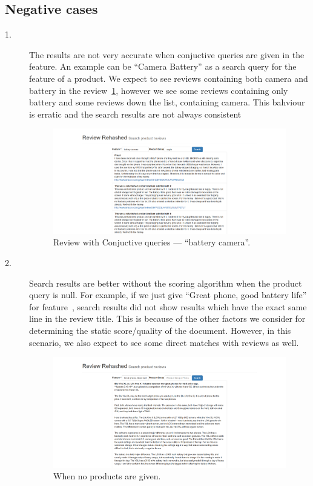 \documentclass{article}
\begin{document}
\subsection{Negative cases}
			\begin{description}
        \item[1.] The results are not very accurate when conjuctive queries are given in the feature. An example can be ``Camera Battery'' as a search query for the feature of a product. We expect to see reviews containing both camera and battery in the review~\ref{fig:battery_camera}, however we see some reviews containing only battery and some reviews down the list, containing camera. This bahviour is erratic and the search results are not always consistent
					\begin{figure}[ht!]
					  \centering
					  \includegraphics[width=1\textwidth]{battery_camera}
					  \caption{Review with Conjuctive queries --- ``battery camera''.~\label{fig:battery_camera}}
					\end{figure}
        \item[2.] Search results are better without the scoring algorithm when the product query is null. For example, if we just give ``Great phone, good battery life'' for feature~\cite{fig:no_product}, search results did not show results which have the exact same line in the review title. This is because of the other factors we consider for determining the static score/quality of the document. However, in this scenario, we also expect to see some direct matches with reviews as well. 
					\begin{figure}[ht!]
					  \centering
					  \includegraphics[width=1\textwidth]{no_product}
					  \caption{When no products are given.~\label{fig:no_product}}
					\end{figure}
			\end{description}
\end{document}
